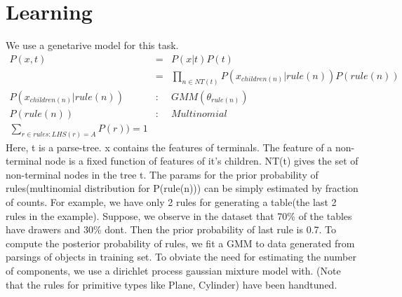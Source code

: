 \documentclass[11pt]{article} %
\begin{document}
\section{Learning}
We use a genetarive model for this task.
\begin{eqnarray}
P(x,t)&=&P(x|t)P(t) \\
&=& \prod_{n \in NT(t)}{P(x_{children(n)} |rule(n) )P(rule(n))}\\
P(x_{children(n)} |rule(n) ) &:& GMM(\theta _{rule(n)})\\
P(rule(n)) &:& Multinomial \\
\sum_{r \in rules:LHS(r)=A}{P(r))}=1
\end{eqnarray}
Here, t is a parse-tree. x contains the features of terminals. The feature of a non-terminal node is a fixed function of features of it's children. NT(t) gives the set of non-terminal nodes in the tree t.
The params for the prior probability of rules(multinomial distribution for P(rule(n))) can be simply estimated by fraction of counts. For example, we have only 2 rules for generating a table(the last 2 rules in the example). Suppose, we observe in the dataset that 70\% of the tables have drawers and 30\% dont. Then the prior probability of last rule is 0.7.
To compute the posterior probability of rules, we fit a GMM to data generated from parsings of objects in training set. To obviate the need for estimating the number of components, we use a dirichlet process gaussian mixture model with. 
(Note that the rules for primitive types like Plane, Cylinder) have been handtuned.
\end{document}
